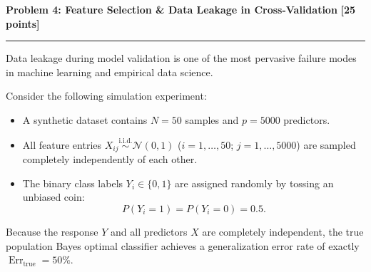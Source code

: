 \documentclass[11pt,a4paper]{article}
\newcommand{\problemheader}[2]{%
  \noindent
  \begin{minipage}{\textwidth}
    {\large\bfseries\textcolor{utblue}{#1}}\hfill
    {\large\bfseries\textcolor{utblue}{#2}}\\[3pt]
    \textcolor{utblue}{\rule{\textwidth}{1pt}}
  \end{minipage}%
  \par\vspace{8pt}
}
\begin{document}
\newpage

\problemheader{Problem 4: Feature Selection \& Data Leakage in Cross-Validation}{[25 points]}

Data leakage during model validation is one of the most pervasive failure modes in machine learning and empirical data science.

Consider the following simulation experiment:
\begin{itemize}[itemsep=2pt, leftmargin=14pt]
  \item A synthetic dataset contains $N = 50$ samples and $p = 5000$ predictors.
  \item All feature entries $X_{ij} \overset{\text{i.i.d.}}{\sim} \mathcal{N}(0, 1)$ ($i = 1, \dots, 50$; $j = 1, \dots, 5000$) are sampled completely independently of each other.
  \item The binary class labels $Y_i \in \{0, 1\}$ are assigned randomly by tossing an unbiased coin:
  \[
    P(Y_i = 1) = P(Y_i = 0) = 0.5.
  \]
\end{itemize}
Because the response $Y$ and all predictors $X$ are completely independent, the true population Bayes optimal classifier achieves a generalization error rate of exactly $\operatorname{Err}_{\text{true}} = 50\%$.
\end{document}
